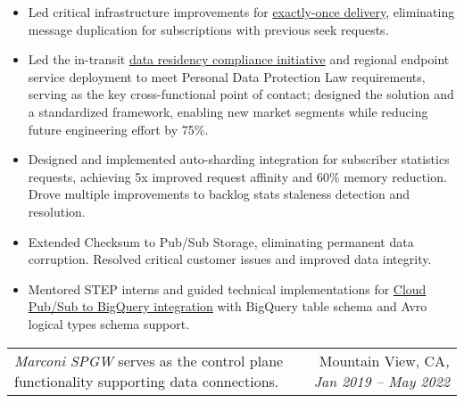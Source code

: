 \documentclass[letterpaper,11pt]{article}
\makeatletter
\newcommand{\resumeItem}[1]{
  \item\small{
    {#1 \vspace{-3pt}}
  }
}
\newcommand{\resumeSubSubheadingMultiteam}[4]{
    \begin{tabular*}{0.97\textwidth}{l@{\extracolsep{\fill}}r}
      \textit{\small#1}{ \scriptsize #4} & {\small#2}\textit{\small, #3} \\
    \end{tabular*}
    \vspace{-7pt}
}
\newcommand{\resumeItemListStart}{\begin{itemize}[leftmargin=*]}
\newcommand{\resumeItemListEnd}{\end{itemize}\vspace{-5pt}}
\makeatother
\begin{document}
      \resumeItemListStart
\resumeItem{Led critical infrastructure improvements for \href{https://cloud.google.com/pubsub/docs/exactly-once-delivery}{exactly-once delivery}, eliminating message duplication for subscriptions with previous seek requests.}

\resumeItem{
Led the in-transit \href{https://cloud.google.com/pubsub/docs/resource-location-restriction}{data residency compliance initiative} and regional endpoint service deployment to meet Personal Data Protection Law requirements, serving as the key cross-functional point of contact; designed the solution and a standardized framework, enabling new market segments while reducing future engineering effort by 75\%.}

\resumeItem{Designed and implemented auto-sharding integration for subscriber statistics requests, achieving 5x improved request affinity and 60\% memory reduction. Drove multiple improvements to backlog stats staleness detection and resolution.}
\resumeItem{Extended Checksum to Pub/Sub Storage, eliminating permanent data corruption. Resolved critical customer issues and improved data integrity.}
\resumeItem{Mentored STEP interns and guided technical implementations for \href{https://cloud.google.com/pubsub/docs/bigquery}{Cloud Pub/Sub to BigQuery integration} with BigQuery table schema and Avro logical types schema support.}
      \resumeItemListEnd

  \resumeSubSubheadingMultiteam
   {Marconi SPGW}{Mountain View, CA}{Jan 2019 -- May 2022}
   {serves as the control plane functionality supporting data connections.}
\end{document}
